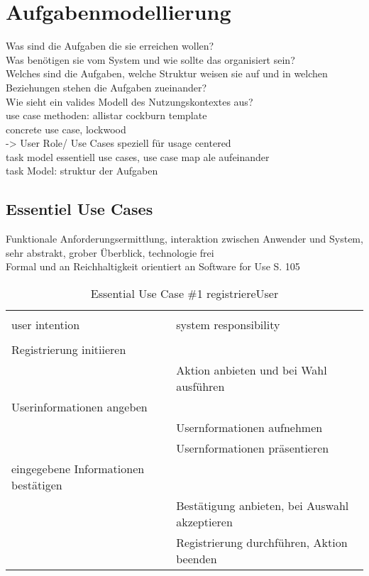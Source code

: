 
\section{Aufgabenmodellierung}

Was sind die Aufgaben die sie erreichen wollen?\\
Was benötigen sie vom System und wie sollte das organisiert sein?\\
Welches sind die Aufgaben, welche Struktur weisen sie auf und in welchen Beziehungen stehen die Aufgaben zueinander?\\
Wie sieht ein valides Modell des Nutzungskontextes aus?\\

use case methoden: allistar cockburn template \\
concrete use case, lockwood\\


-> User Role/ Use Cases speziell für usage centered	\\
task model essentiell use cases, use case map ale aufeinander\\

task Model: struktur der Aufgaben\\


\subsection{Essentiel Use Cases}
Funktionale Anforderungsermittlung, interaktion zwischen Anwender und System, sehr abstrakt, grober Überblick, technologie frei\\
Formal und an Reichhaltigkeit orientiert an Software for Use S. 105

\begin{table}[H]
\caption{Essential Use Case \#1 registriereUser }
\centering
\begin{tabular}{l l}
\\ [-0.5ex]

\hline\hline
\\ [-0.5ex]
user intention & system responsibility
\\ [1.5ex]
\hline
\\ [-0.5ex]
Registrierung initiieren	& 											\\[1ex]
							& Aktion anbieten und bei Wahl ausführen	\\[1ex]
Userinformationen angeben 	& 											\\[1ex] 
							& Usernformationen aufnehmen					\\[1ex]
							& Usernformationen präsentieren				\\[1ex]
eingegebene Informationen bestätigen	& 											\\[1ex]
							& Bestätigung anbieten, bei Auswahl akzeptieren  \\[1ex]
							& Registrierung durchführen, Aktion beenden	\\[1ex]


\hline
\end{tabular}
\label{tab:anmelden}
\end{table}

